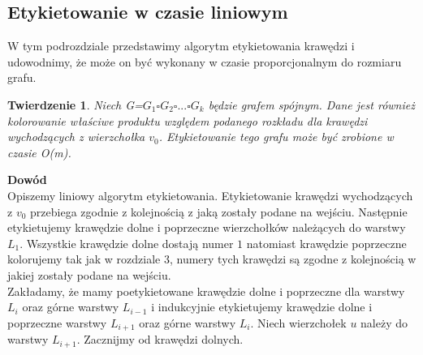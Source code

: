 \documentclass[12pt,a4paper,titlepage]{article}
\newtheorem{twr}{Twierdzenie}
\newcommand\tab[1][1cm]{\hspace*{#1}}
\begin{document}
\subsection{Etykietowanie w czasie liniowym}
\tab[0.6cm]W tym podrozdziale przedstawimy algorytm etykietowania krawędzi i udowodnimy, że może on być wykonany w czasie proporcjonalnym do rozmiaru grafu.
\begin{twr}
Niech G=$G_1 \square G_2 \square ... \square G_k$ będzie grafem spójnym. Dane jest również kolorowanie właściwe produktu względem podanego rozkładu dla krawędzi wychodzących z wierzchołka $v_0$. Etykietowanie tego grafu może być zrobione w czasie O(m).
\end{twr}
\tab[-0.6cm]\textbf{Dowód}\\
\tab[0.6cm]Opiszemy liniowy algorytm etykietowania. Etykietowanie krawędzi wychodzących z $v_0$ przebiega zgodnie z kolejnością z jaką zostały podane na wejściu. Następnie etykietujemy krawędzie dolne i poprzeczne wierzchołków należących do warstwy $L_1$. Wszystkie krawędzie dolne dostają numer $1$ natomiast krawędzie poprzeczne kolorujemy tak jak w rozdziale 3, numery tych krawędzi są zgodne z kolejnością w jakiej zostały podane na wejściu. \\
\tab[0.6cm]Zakładamy, że mamy poetykietowane krawędzie dolne i poprzeczne dla warstwy $L_i$ oraz górne warstwy $L_{i-1}$ i indukcyjnie etykietujemy krawędzie dolne i poprzeczne warstwy $L_{i+1}$ oraz górne warstwy $L_i$. Niech wierzchołek $u$ należy do warstwy $L_{i+1}$. Zacznijmy od krawędzi dolnych. \\
\end{document}
